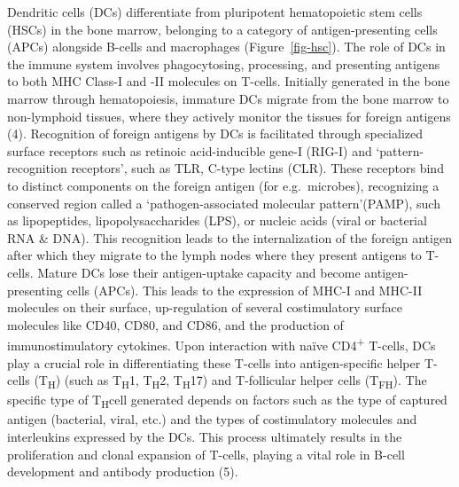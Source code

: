 \documentclass[
]{article}
\begin{document}
Dendritic cells (DCs) differentiate from pluripotent hematopoietic stem
cells (HSCs) in the bone marrow, belonging to a category of
antigen-presenting cells (APCs) alongside B-cells and macrophages
(Figure~\ref{fig-hsc}). The role of DCs in the immune system involves
phagocytosing, processing, and presenting antigens to both MHC Class-I
and -II molecules on T-cells. Initially generated in the bone marrow
through hematopoiesis, immature DCs migrate from the bone marrow to
non-lymphoid tissues, where they actively monitor the tissues for
foreign antigens (4). Recognition of foreign antigens by DCs is
facilitated through specialized surface receptors such as retinoic
acid-inducible gene-I (RIG-I) and `pattern-recognition receptors', such
as TLR, C-type lectins (CLR). These receptors bind to distinct
components on the foreign antigen (for e.g.~microbes), recognizing a
conserved region called a `pathogen-associated molecular pattern'(PAMP),
such as lipopeptides, lipopolysaccharides (LPS), or nucleic acids (viral
or bacterial RNA \& DNA). This recognition leads to the internalization
of the foreign antigen after which they migrate to the lymph nodes where
they present antigens to T-cells. Mature DCs lose their antigen-uptake
capacity and become antigen-presenting cells (APCs). This leads to the
expression of MHC-I and MHC-II molecules on their surface, up-regulation
of several costimulatory surface molecules like CD40, CD80, and CD86,
and the production of immunostimulatory cytokines. Upon interaction with
naïve CD4\textsuperscript{+} T-cells, DCs play a crucial role in
differentiating these T-cells into antigen-specific helper T-cells
(T\textsubscript{H}) (such as T\textsubscript{H}1, T\textsubscript{H}2,
T\textsubscript{H}17) and T-follicular helper cells
(T\textsubscript{FH}). The specific type of T\textsubscript{H}cell
generated depends on factors such as the type of captured antigen
(bacterial, viral, etc.) and the types of costimulatory molecules and
interleukins expressed by the DCs. This process ultimately results in
the proliferation and clonal expansion of T-cells, playing a vital role
in B-cell development and antibody production (5).
\end{document}
